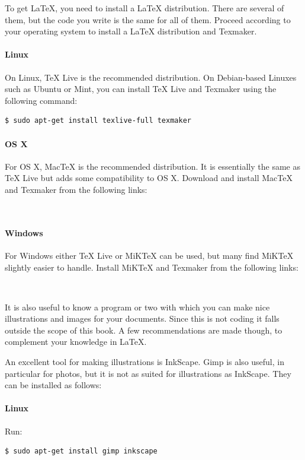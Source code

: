 To get \LaTeX{}, you need to install a \LaTeX{} distribution. There are several of them, but the code you write is the same for all of them. Proceed according to your operating system to install a \LaTeX{} distribution and Texmaker.

\paragraph{Linux}
On Linux, TeX Live is the recommended distribution. On Debian-based Linuxes such as Ubuntu or Mint, you can install TeX Live and Texmaker using the following command:
\begin{verbatim}
$ sudo apt-get install texlive-full texmaker
\end{verbatim}

\paragraph{OS X}
For OS X, MacTeX is the recommended distribution. It is essentially the same as TeX Live but adds some compatibility to OS X. Download and install MacTeX and Texmaker from the following links:

~\\

\paragraph{Windows}
For Windows either TeX Live or MiKTeX can be used, but many find MiKTeX slightly easier to handle. Install MiKTeX and Texmaker from the following links:

~\\

It is also useful to know a program or two with which you can make nice illustrations and images for your documents. Since this is not coding it falls outside the scope of this book. A few recommendations are made though, to complement your knowledge in \LaTeX.  

An excellent tool for making illustrations is InkScape. Gimp is also useful, in particular for photos, but it is not as suited for illustrations as InkScape. They can be installed as follows:

\paragraph{Linux} Run:
\begin{verbatim}
$ sudo apt-get install gimp inkscape
\end{verbatim}


